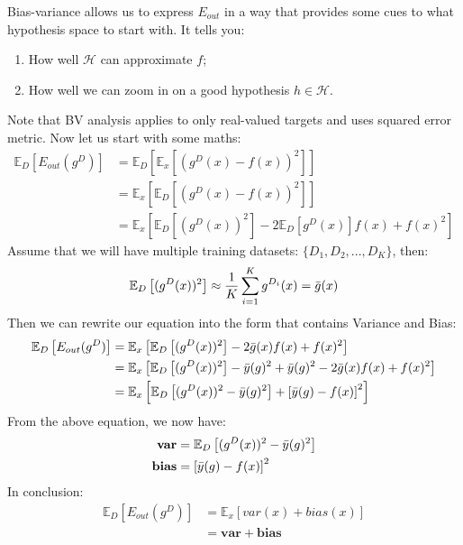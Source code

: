\documentclass{article}
\begin{document}
Bias-variance allows us to express $E_{out}$ in a way that provides some cues to what hypothesis space to start with. It tells you:
\begin{enumerate}
    \item How well $\mathcal{H}$ can approximate $f$;
    \item How well we can zoom in on a good hypothesis $h \in \mathcal{H}$.
\end{enumerate}
Note that BV analysis applies to only real-valued targets and uses squared error metric. Now let us start with some maths:
\begin{align*}
    \mathbb{E}_{D}\left[ E_{out}(g^{D}) \right]
    &= \mathbb{E}_{D} \left[ \mathbb{E}_{x} \left[  (g^{D}(x) - f(x))^{2} \right]  \right]\\
    &= \mathbb{E}_{x} \left[ \mathbb{E}_{D} \left[  (g^{D}(x) - f(x))^{2} \right]  \right]\\
    &= \mathbb{E}_{x} \left[ \mathbb{E}_{D} \left[  (g^{D}(x))^{2} \right] -2\mathbb{E}_{D}[g^{D}(x)]f(x) + f(x)^{2} \right]
\end{align*}
Assume that we will have multiple training datasets: $\{ D_1, D_2, ..., D_K \}$, then:
\begin{align*}
    \mathbb{E}_{D} \left[  (g^{D}(x))^{2} \right] \approx \frac{1}{K} \sum_{i=1}^{K} g^{D_{i}}(x) = \Bar{g}(x)
\end{align*}
Then we can rewrite our equation into the form that contains Variance and Bias:
\begin{align*}
    \mathbb{E}_{D}\left[ E_{out}(g^{D}) \right]
    &= \mathbb{E}_{x} \left[ \mathbb{E}_{D} \left[  (g^{D}(x))^{2} \right] -2\Bar{g}(x)f(x) + f(x)^{2} \right]\\
    &= \mathbb{E}_{x} \left[ \mathbb{E}_{D} \left[  (g^{D}(x))^{2} \right]-\Bar{y}(g)^{2}+\Bar{y}(g)^{2} -2\Bar{g}(x)f(x) + f(x)^{2} \right]\\
    &= \mathbb{E}_{x} \left[ \mathbb{E}_{D} \left[  (g^{D}(x))^{2} -\Bar{y}(g)^{2}\right]+\left[  \Bar{y}(g) - f(x)\right]^{2} \right]
\end{align*}
From the above equation, we now have:
\begin{align*}
    \textbf{var} &= \mathbb{E}_{D} \left[  (g^{D}(x))^{2} -\Bar{y}(g)^{2}\right]\\
    \textbf{bias} &= \left[  \Bar{y}(g) - f(x)\right]^{2}
\end{align*}
In conclusion:
\begin{align*}
     \mathbb{E}_{D}\left[ E_{out}(g^{D}) \right]
     &= \mathbb{E}_{x}\left[ var(x) +bias(x) \right]\\
     &= \textbf{var} + \textbf{bias}
\end{align*}
\end{document}
